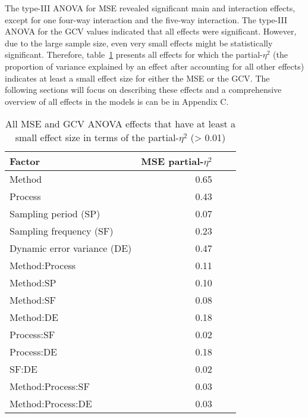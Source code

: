 \documentclass[man, floatsintext]{apa7}
\begin{document}
The type-III ANOVA for MSE revealed significant main and interaction effects,
except for one four-way interaction and the five-way interaction. The type-III
ANOVA for the GCV values indicated that all effects were significant. However,
due to the large sample size, even very small effects might be statistically
significant. Therefore, table~\ref{tab:peta} presents all effects for which the
partial-$\eta^2$ (the proportion of variance explained by an effect after
accounting for all other effects) indicates at least a small effect size for
either the MSE or the GCV\@. The following sections will focus on describing
these effects and a comprehensive overview of all effects in the models is can
be in Appendix C.

\begin{table}[htbp]
  \vspace*{2em}
  \begin{threeparttable}
    \caption{All MSE and GCV ANOVA effects that have at least a small effect
      size in terms of the partial-$\eta^2$ (> 0.01)}
    \label{tab:peta}
    \begin{tabular}{@{}lrrr@{}} \toprule Factor & MSE partial-$\eta^2$ \\
               \midrule Method              & 0.65                 \\
               Process                      & 0.43                 \\
               Sampling period (SP)         & 0.07                 \\
               Sampling frequency (SF)      & 0.23                 \\
               Dynamic error variance (DE)  & 0.47                 \\
               Method:Process               & 0.11                 \\
               Method:SP                    & 0.10                 \\
               Method:SF                    & 0.08                 \\
               Method:DE                    & 0.18                 \\
               Process:SF                   & 0.02                 \\
               Process:DE                   & 0.18                 \\
               SF:DE                        & 0.02                 \\
               Method:Process:SF            & 0.03                 \\
               Method:Process:DE            & 0.03                 \\ \midrule
    \end{tabular}
  \end{threeparttable}
\end{table}
\end{document}
